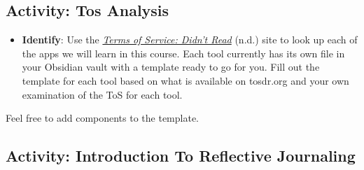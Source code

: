 \documentclass[
  letterpaper,
  DIV=11,
  numbers=noendperiod]{scrreprt}
\providecommand{\tightlist}{%
  \setlength{\itemsep}{0pt}\setlength{\parskip}{0pt}}\usepackage{longtable,booktabs,array}
\begin{document}
\subsection{Activity: Tos Analysis}\label{activity-tos-analysis}

\begin{tcolorbox}[enhanced jigsaw, toprule=.15mm, colback=white, colframe=quarto-callout-note-color-frame, bottomtitle=1mm, leftrule=.75mm, coltitle=black, titlerule=0mm, rightrule=.15mm, colbacktitle=quarto-callout-note-color!10!white, left=2mm, title={Learning Activity}, opacitybacktitle=0.6, opacityback=0, breakable, toptitle=1mm, arc=.35mm, bottomrule=.15mm]

\begin{itemize}
\tightlist
\item
  \textbf{Identify}: Use the \href{https://tosdr.org/}{\emph{Terms of
  Service: Didn't Read}} (n.d.) site to look up each of the apps we will
  learn in this course. Each tool currently has its own file in your
  Obsidian vault with a template ready to go for you. Fill out the
  template for each tool based on what is available on tosdr.org and
  your own examination of the ToS for each tool.
\end{itemize}

Feel free to add components to the template.

\end{tcolorbox}

\subsection{Activity: Introduction To Reflective
Journaling}\label{activity-introduction-to-reflective-journaling}
\end{document}
